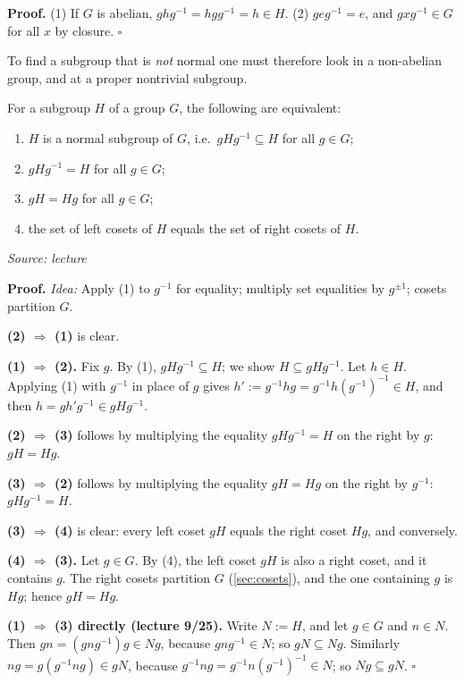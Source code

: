 \documentclass[11pt]{report}
\renewenvironment{proof}[1][Proof]{\noindent\textbf{#1.} }{\hfill$\square$\par\vspace{5pt}}
\newcommand{\srcline}[1]{\par\hfill{\footnotesize\textit{Source: #1}}}
\begin{document}
\begin{proof}
(1) If $G$ is abelian, $ghg^{-1} = hgg^{-1} = h \in H$. (2) $geg^{-1} = e$, and $gxg^{-1} \in G$ for all $x$ by closure.
\end{proof}

\begin{rembox}\label{rem:where-look-non-normal-subgroups}
To find a subgroup that is \emph{not} normal one must therefore look in a non-abelian group, and at a proper nontrivial subgroup.
\end{rembox}

\begin{propbox}\label{prop:characterizations-normality}
For a subgroup $H$ of a group $G$, the following are equivalent:
\begin{enumerate}
    \item $H$ is a normal subgroup of $G$, i.e.\ $gHg^{-1} \subseteq H$ for all $g \in G$;
    \item $gHg^{-1} = H$ for all $g \in G$;
    \item $gH = Hg$ for all $g \in G$;
    \item the set of left cosets of $H$ equals the set of right cosets of $H$.
\end{enumerate}
\srcline{lecture}
\end{propbox}

\begin{proof}
\textit{Idea:} Apply (1) to $g^{-1}$ for equality; multiply set equalities by $g^{\pm 1}$; cosets partition $G$.\par
\textbf{(2) $\Rightarrow$ (1)} is clear.

\textbf{(1) $\Rightarrow$ (2).} Fix $g$. By (1), $gHg^{-1} \subseteq H$; we show $H \subseteq gHg^{-1}$. Let $h \in H$. Applying (1) with $g^{-1}$ in place of $g$ gives $h' := g^{-1}hg = g^{-1}h(g^{-1})^{-1} \in H$, and then $h = gh'g^{-1} \in gHg^{-1}$.

\textbf{(2) $\Rightarrow$ (3)} follows by multiplying the equality $gHg^{-1} = H$ on the right by $g$: $gH = Hg$.

\textbf{(3) $\Rightarrow$ (2)} follows by multiplying the equality $gH = Hg$ on the right by $g^{-1}$: $gHg^{-1} = H$.

\textbf{(3) $\Rightarrow$ (4)} is clear: every left coset $gH$ equals the right coset $Hg$, and conversely.

\textbf{(4) $\Rightarrow$ (3).} Let $g \in G$. By (4), the left coset $gH$ is also a right coset, and it contains $g$. The right cosets partition $G$ (\ref{sec:cosets}), and the one containing $g$ is $Hg$; hence $gH = Hg$.

\textbf{(1) $\Rightarrow$ (3) directly (lecture 9/25).} Write $N := H$, and let $g \in G$ and $n \in N$. Then $gn = (gng^{-1})g \in Ng$, because $gng^{-1} \in N$; so $gN \subseteq Ng$. Similarly $ng = g(g^{-1}ng) \in gN$, because $g^{-1}ng = g^{-1}n(g^{-1})^{-1} \in N$; so $Ng \subseteq gN$.
\end{proof}
\end{document}
